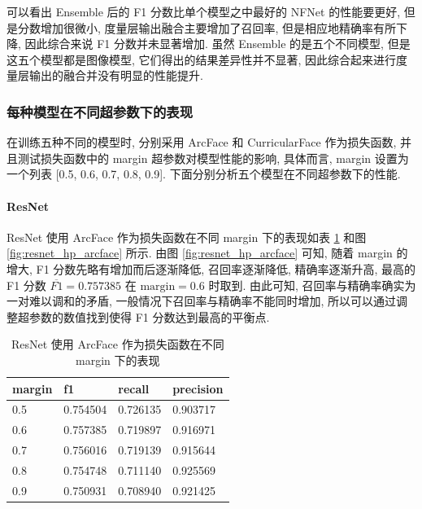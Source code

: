 \documentclass[12pt]{article}
\begin{document}
可以看出 Ensemble 后的 F1 分数比单个模型之中最好的 NFNet 的性能要更好, 但是分数增加很微小, 度量层输出融合主要增加了召回率, 但是相应地精确率有所下降, 因此综合来说 F1 分数并未显著增加. 虽然 Ensemble 的是五个不同模型, 但是这五个模型都是图像模型, 它们得出的结果差异性并不显著, 因此综合起来进行度量层输出的融合并没有明显的性能提升.

\subsubsection{每种模型在不同超参数下的表现}

在训练五种不同的模型时, 分别采用 ArcFace \cite{Deng2019Arcface} 和 CurricularFace \cite{Huang2020Curricularface} 作为损失函数, 并且测试损失函数中的 margin 超参数对模型性能的影响, 具体而言, margin 设置为一个列表 [0.5, 0.6, 0.7, 0.8, 0.9]. 下面分别分析五个模型在不同超参数下的性能.

\paragraph{ResNet}

ResNet 使用 ArcFace 作为损失函数在不同 margin 下的表现如表 \ref{tab:resnet_hp_arcface} 和图 \ref{fig:resnet_hp_arcface} 所示. 由图 \ref{fig:resnet_hp_arcface} 可知, 随着 margin 的增大, F1 分数先略有增加而后逐渐降低, 召回率逐渐降低, 精确率逐渐升高, 最高的 F1 分数 $\overline{F1}=0.757385$ 在 $\text{margin} = 0.6$ 时取到. 由此可知, 召回率与精确率确实为一对难以调和的矛盾, 一般情况下召回率与精确率不能同时增加, 所以可以通过调整超参数的数值找到使得 F1 分数达到最高的平衡点.

\begin{table}[htbp]
  \centering
  \caption{ResNet 使用 ArcFace 作为损失函数在不同 margin 下的表现}
  \label{tab:resnet_hp_arcface}
  \begin{tabular}{llll}
    \toprule
    margin & f1       & recall   & precision \\
    \midrule
    0.5    & 0.754504 & 0.726135 & 0.903717  \\
    0.6    & 0.757385 & 0.719897 & 0.916971  \\
    0.7    & 0.756016 & 0.719139 & 0.915644  \\
    0.8    & 0.754748 & 0.711140 & 0.925569  \\
    0.9    & 0.750931 & 0.708940 & 0.921425 \\
    \bottomrule
  \end{tabular}
\end{table}
\end{document}
